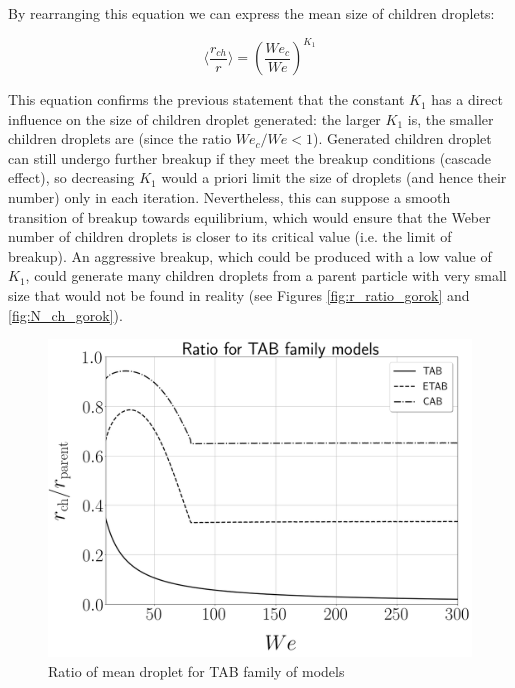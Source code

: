 By rearranging this equation we can express the mean size of children droplets:

\begin{equation}
\langle  \frac{r_{ch}}{r} \rangle = \left( \frac{We_c}{We} \right)^{K_1}
\end{equation}

This equation confirms the previous statement that the constant $K_1$ has a direct influence on the size of children droplet generated: the larger $K_1$ is, the smaller children droplets are (since the ratio $We_c/We < 1$). Generated children droplet can still undergo further breakup if they meet the breakup conditions (cascade effect), so decreasing $K_1$ would a priori limit the size of droplets (and hence their number) only in each iteration. Nevertheless, this can suppose a smooth transition of breakup towards equilibrium, which would ensure that the Weber number of children droplets is closer to its critical value (i.e. the limit of breakup). An aggressive breakup, which could be produced with a low value of $K_1$, could generate many children droplets from a parent particle with very small size that would not be found in reality (see Figures \ref{fig:r_ratio_gorok} and \ref{fig:N_ch_gorok}).



\begin{figure}[h!]
	\centering
	\includegraphics[scale=0.2]{./part2_developments/figures_ch4_SLI/ratio_droplet_size_TAB}
	\caption{Ratio of mean droplet for TAB family of models}
	\label{fig:r_ratio_TAB}
\end{figure}

